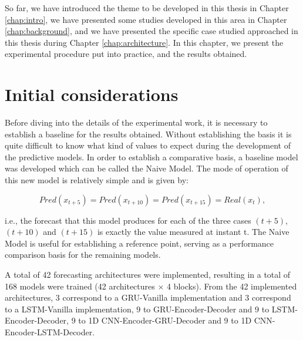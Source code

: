 \cleardoublepage
\label{chap:results}

So far, we have introduced the theme to be developed in this thesis in Chapter \ref{chap:intro}, we have presented some studies developed in this area in Chapter \ref{chap:background}, and we have presented the specific case studied approached in this thesis during Chapter \ref{chap:architecture}. In this chapter, we present the experimental procedure put into practice, and the results obtained.



\section{Initial considerations}

Before diving into the details of the experimental work, it is necessary to establish a baseline for the results obtained. Without establishing the basis it is quite difficult to know what kind of values to expect during the development of the predictive models. In order to establish a comparative basis, a baseline model was developed which can be called the Naive Model. The mode of operation of this new model is relatively simple and is given by:

\begin{equation}
   Pred(x_{t+5}) = Pred(x_{t+10}) = Pred(x_{t+15}) = Real(x_{t}),
   \label{naive}
\end{equation}

i.e., the forecast that this model produces for each of the three cases $(t+5)$, $(t+10)$ and $(t+15)$ is exactly the value measured at instant t. The Naive Model is useful for establishing a reference point, serving as a performance comparison basis for the remaining models.

A total of 42 forecasting architectures were implemented, resulting in a total of 168 models were trained (42 architectures $\times$ 4 blocks). From the 42 implemented architectures, 3 correspond to a \ac{GRU}-Vanilla implementation and 3 correspond to a \ac{LSTM}-Vanilla implementation, 9 to \ac{GRU}-Encoder-Decoder and 9 to \ac{LSTM}-Encoder-Decoder, 9 to \ac{1D CNN}-Encoder-\ac{GRU}-Decoder and 9 to \ac{1D CNN}-Encoder-\ac{LSTM}-Decoder.

